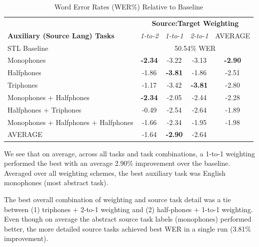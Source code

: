 \documentclass[a4paper]{article}
\begin{document}
\begin{table}[!htbp]
  \centering
  \caption{Word Error Rates (WER\%) Relative to Baseline}
    \label{tab:results}
  \begin{adjustbox}{width=.475\textwidth}
    \begin{tabular}{lcccc}
      \toprule
      & \multicolumn{4}{c}{\textbf{Source:Target Weighting}} \\
      \textbf{Auxiliary (Source Lang) Tasks} & \textit{1-to-2} & \textit{1-to-1} & \textit{2-to-1} & AVERAGE\\
      \midrule
      STL Baseline                          &               \multicolumn{4}{c}{50.54\% WER}  \\
      Monophones                            & \textbf{-2.34}  & -3.22           & -3.13           & \textbf{-2.90}\\
      Halfphones                            & -1.86           & \textbf{-3.81}  & -1.86           & -2.51\\
      Triphones                             & -1.17           & -3.42           & \textbf{-3.81}  & -2.80\\
      Monophones + Halfphones               & \textbf{-2.34}  & -2.05           & -2.44           & -2.28\\
      Halfphones + Triphones                & -0.49           & -2.54           & -2.64           & -1.89\\
      Monophones + Halfphones + Halfphones  & -1.66           & -2.34           & -1.95           & -1.98\\
      \midrule
      AVERAGE                               & -1.64           & \textbf{-2.90}  & -2.64           & \\
      \bottomrule
    \end{tabular}
  \end{adjustbox}
\end{table}

We see that on average, across all tasks and task combinations, a 1-to-1 weighting performed the best with an average 2.90\% improvement over the baseline. Averaged over all weighting schemes, the best auxiliary task was English monophones (most abstract task).

The best overall combination of weighting and source task detail was a tie between (1) triphones + 2-to-1 weighting and (2) half-phones + 1-to-1 weighting. Even though on average the abstract source task labels (monophones) performed better, the more detailed source tasks achieved best WER in a single run (3.81\% improvement).
\end{document}
